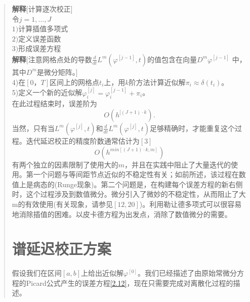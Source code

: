 \documentclass{article}
\begin{document}
\begin{CJK}{UTF8}{gkai}
\begin{quotation}
\textbf{解释}[计算逐次校正]\\

令$j=1,\ldots,J$\\

$1)$计算插值多项式\\

$2)$定义误差函数\\

$3)$形成误差方程\\

\textbf{解释}[注意网格点处的导数$\frac{d}{dt}L^m(\varphi^{[j-1]},t)$的值包含在向量$D^m\varphi ^{[j-1]}$ 中，其中$D^m$是微分矩阵。]\\

4)在$[0，T]$区间上的网格点$t_i$上，用$k$阶方法计算近似解$\pi_i \approx \delta(t_i)$。\\

5)定义一个新的近似解$\varphi_{i}^{[j]}= \varphi_{i}^{[j-1]}+\pi _i$。\\

在此过程结束时，误差阶为\\
\begin{equation}
O(h^{[(J+1) \cdot k}).
\end{equation}
当然，只有当$L^m(\varphi^{[j]},t)$和$\frac{d}{dt}L^m(\varphi^{[j]},t)$足够精确时，才能重复这个过程。迭代延迟校正的精度阶数通常估计为$[3]$\\
\begin{equation}
O(h^{min[(J+1) \cdot k,m]})
\end{equation}
有两个独立的因素限制了使用大的$m$，并且在实践中阻止了大量迭代的使用。第一个问题与等间距节点近似的不稳定性有关；如前所述，该过程在数值上是病态的(Runge现象)。第二个问题是，在构建每个误差方程的新右侧时，这个过程涉及到数值微分。微分引入了微妙的不稳定性，从而阻止了大m的有效使用(有关现象，请参见$[12,20]$)。利用勒让德多项式可以很容易地消除插值的困难。以皮卡德方程为出发点，消除了数值微分的需要。\\
\section{谱延迟校正方案}

假设我们在区间$[a,b]$上给出近似解$\varphi^{[0]}$。我们已经描述了由原始常微分方程的Picard公式产生的误差方程\ref{2.12}，现在只需要完成对离散化过程的描述。\\


\end{quotation}
\end{CJK}
\end{document}

